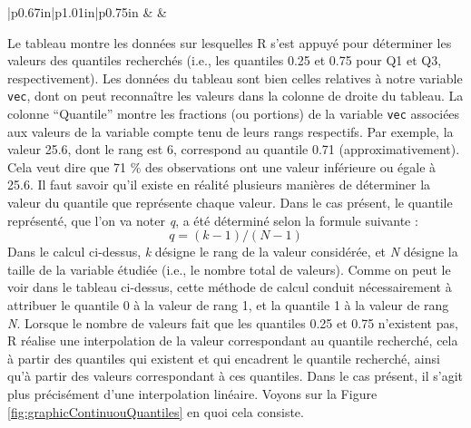 \documentclass[
  french,
]{book}
\begin{document}
\begin{longtable}[c]{|p{0.67in}|p{1.01in}|p{0.75in}}
 &  &  \\




\end{longtable}

Le tableau montre les données sur lesquelles R s'est appuyé pour déterminer les valeurs des quantiles recherchés (i.e., les quantiles 0.25 et 0.75 pour Q1 et Q3, respectivement). Les données du tableau sont bien celles relatives à notre variable \texttt{vec}, dont on peut reconnaître les valeurs dans la colonne de droite du tableau. La colonne ``Quantile'' montre les fractions (ou portions) de la variable \texttt{vec} associées aux valeurs de la variable compte tenu de leurs rangs respectifs. Par exemple, la valeur 25.6, dont le rang est 6, correspond au quantile 0.71 (approximativement). Cela veut dire que 71 \% des observations ont une valeur inférieure ou égale à 25.6. Il faut savoir qu'il existe en réalité plusieurs manières de déterminer la valeur du quantile que représente chaque valeur. Dans le cas présent, le quantile représenté, que l'on va noter \emph{q}, a été déterminé selon la formule suivante :
\[q = (k - 1 ) / (N - 1)\]
Dans le calcul ci-dessus, \emph{k} désigne le rang de la valeur considérée, et \emph{N} désigne la taille de la variable étudiée (i.e., le nombre total de valeurs). Comme on peut le voir dans le tableau ci-dessus, cette méthode de calcul conduit nécessairement à attribuer le quantile 0 à la valeur de rang 1, et la quantile 1 à la valeur de rang \emph{N}. Lorsque le nombre de valeurs fait que les quantiles 0.25 et 0.75 n'existent pas, R réalise une interpolation de la valeur correspondant au quantile recherché, cela à partir des quantiles qui existent et qui encadrent le quantile recherché, ainsi qu'à partir des valeurs correspondant à ces quantiles. Dans le cas présent, il s'agit plus précisément d'une interpolation linéaire. Voyons sur la Figure \ref{fig:graphicContinuouQuantiles} en quoi cela consiste.
\end{document}
